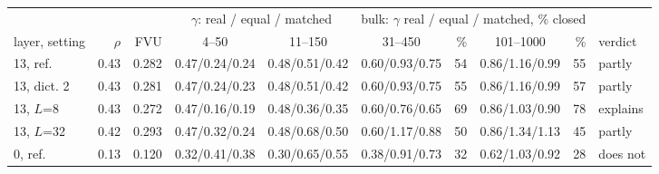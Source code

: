 \begin{tabular}{l r r cc cr cr l}
\toprule
 & & & \multicolumn{2}{c}{$\gamma$: real / equal / matched} & \multicolumn{4}{c}{bulk: $\gamma$ real / equal / matched, \% closed} & \\
\cmidrule(lr){4-5}\cmidrule(lr){6-9}
layer, setting & $\rho$ & FVU & 4--50 & 11--150 & 31--450 & \% & 101--1000 & \% & verdict \\
\midrule
13, ref. & 0.43 & 0.282 & 0.47/0.24/0.24 & 0.48/0.51/0.42 & 0.60/0.93/0.75 & 54 & 0.86/1.16/0.99 & 55 & partly \\
13, dict. 2 & 0.43 & 0.281 & 0.47/0.24/0.23 & 0.48/0.51/0.42 & 0.60/0.93/0.75 & 55 & 0.86/1.16/0.99 & 57 & partly \\
13, $L$=8 & 0.43 & 0.272 & 0.47/0.16/0.19 & 0.48/0.36/0.35 & 0.60/0.76/0.65 & 69 & 0.86/1.03/0.90 & 78 & explains \\
13, $L$=32 & 0.42 & 0.293 & 0.47/0.32/0.24 & 0.48/0.68/0.50 & 0.60/1.17/0.88 & 50 & 0.86/1.34/1.13 & 45 & partly \\
0, ref. & 0.13 & 0.120 & 0.32/0.41/0.38 & 0.30/0.65/0.55 & 0.38/0.91/0.73 & 32 & 0.62/1.03/0.92 & 28 & does not \\
\bottomrule
\end{tabular}
